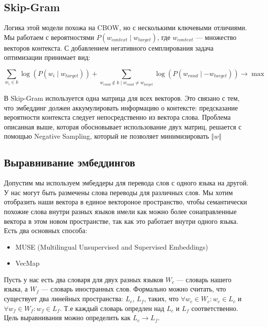 \documentclass{article}
\begin{document}
    \subsection{Skip-Gram}  
    Логика этой модели похожа на CBOW, 
    но с несколькими ключевыми отличиями. 
    Мы работаем с вероятностями \( P(w_{context} \mid w_{target}) \), где \( w_{context} \) — множество векторов контекста.
    С добавлением негативного семплирования задача оптимизации принимает вид:  
    
    \[
    \sum_{w_i \in k} \log(P(w_i \mid w_{target})) + \sum_{w_{rand} \notin k \mid w_{rand} \neq w_{target}} \log(P(w_{rand} \mid -w_{target})) \rightarrow \max
    \]  
    
    В Skip-Gram используется одна матрица для всех векторов. Это связано с тем, что эмбеддинг должен аккумулировать информацию о контексте: предсказание вероятности контекста следует непосредственно из вектора слова.
    Проблема описанная выше, которая обосновывает использование двух матриц, решается с помощью Negative Sampling, который не позволяет минимизировать $\Vert w \Vert$

    \subsection{Выравнивание эмбеддингов}

    Допустим мы используем эмбеддеры для перевода слов с одного языка на другой. У нас могут быть размечены слова переводы для различных слов. 
    Мы хотим отобразить наши вектора в единое вектороное пространство, чтобы семантически похожие слова внутри разных языков 
    имели как можно более сонаправленные вектора в этом новом пространстве, так как это работает внутри одного языка. Есть два основных способа:

    \begin{itemize}
        \item MUSE (Multilingual Unsupervised and Supervised Embeddings)
        \item VecMap
    \end{itemize}

    Пусть у нас есть два словаря для двух разных языков $W_{c}$ --- словарь нашего языка, а $W_{f}$ --- словарь иностранных слов. 
    Формально можно считать, что существует два линейных пространства: $L_{c}$, $L_{f}$, таких, что 
    $\forall w_{c} \in W_{c} : w_{c} \in L_{c}$ и $\forall w_{f} \in W_{f} : w_{f} \in L_{f}$.
    Т.е каждый словарь опредлен над $L_{c}$ и $L_{f}$ соответственно. Цель выравнивания можно определить как 
    $L_{c} \rightarrow L_{f}$.
\end{document}
